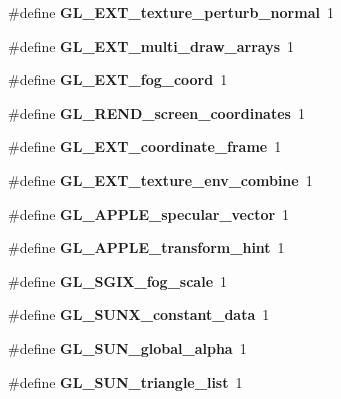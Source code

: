 \begin{DoxyCompactItemize}
\item 
\#define {\bfseries G\+L\+\_\+\+E\+X\+T\+\_\+texture\+\_\+perturb\+\_\+normal}~1\label{_s_d_l__opengl_8h_af682c5cf3536fbaae0348ef29a27b819}

\item 
\#define {\bfseries G\+L\+\_\+\+E\+X\+T\+\_\+multi\+\_\+draw\+\_\+arrays}~1\label{_s_d_l__opengl_8h_ac37848bac8f6b202d656de5ac7d0d915}

\item 
\#define {\bfseries G\+L\+\_\+\+E\+X\+T\+\_\+fog\+\_\+coord}~1\label{_s_d_l__opengl_8h_aa97b9520d532d1fcc7018d7c9acf82f2}

\item 
\#define {\bfseries G\+L\+\_\+\+R\+E\+N\+D\+\_\+screen\+\_\+coordinates}~1\label{_s_d_l__opengl_8h_a5ba573d2cf1db3e6616cf09754704ff8}

\item 
\#define {\bfseries G\+L\+\_\+\+E\+X\+T\+\_\+coordinate\+\_\+frame}~1\label{_s_d_l__opengl_8h_a9d844e0d7d69b473c96f03312ef40cd2}

\item 
\#define {\bfseries G\+L\+\_\+\+E\+X\+T\+\_\+texture\+\_\+env\+\_\+combine}~1\label{_s_d_l__opengl_8h_a32ce1e4f21a95ea92694b4285706be96}

\item 
\#define {\bfseries G\+L\+\_\+\+A\+P\+P\+L\+E\+\_\+specular\+\_\+vector}~1\label{_s_d_l__opengl_8h_a3eb1a459f6b47d50c99f4eeb43927983}

\item 
\#define {\bfseries G\+L\+\_\+\+A\+P\+P\+L\+E\+\_\+transform\+\_\+hint}~1\label{_s_d_l__opengl_8h_a19651b8f5d3ccb06579e822d4602e079}

\item 
\#define {\bfseries G\+L\+\_\+\+S\+G\+I\+X\+\_\+fog\+\_\+scale}~1\label{_s_d_l__opengl_8h_ae8a68294d465e3f1b5b57747d5c5c9dd}

\item 
\#define {\bfseries G\+L\+\_\+\+S\+U\+N\+X\+\_\+constant\+\_\+data}~1\label{_s_d_l__opengl_8h_a80d1f0c4a24874a4d52bf738cf1c256c}

\item 
\#define {\bfseries G\+L\+\_\+\+S\+U\+N\+\_\+global\+\_\+alpha}~1\label{_s_d_l__opengl_8h_a4fdf89d7afac9ac54b6c24fc56f4b849}

\item 
\#define {\bfseries G\+L\+\_\+\+S\+U\+N\+\_\+triangle\+\_\+list}~1\label{_s_d_l__opengl_8h_a31ca9aa9a50f8dbd953a530863175f3b}


\end{DoxyCompactItemize}

